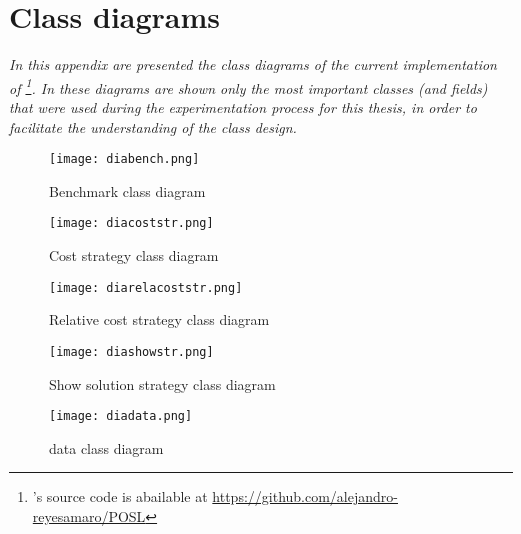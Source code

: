 \chapter{\posl{} Class diagrams}
\label{app:diag}
\textit{In this appendix are presented the class diagrams of the current implementation of \posl\footnote{\posl's source code is abailable at \href{https://github.com/alejandro-reyesamaro/POSL}{https://github.com/alejandro-reyesamaro/POSL}}. In these diagrams are shown only the most important classes (and fields) that were used during the experimentation process for this thesis, in order to facilitate the understanding of the class design.}
\vfill
\newpage



\clearpage


\begin{figure}
	\centering
	\texttt{[image: diabench.png]}
	\caption[]{Benchmark class diagram}\label{diag:bench}
\end{figure}

\begin{figure}
	\centering
	\texttt{[image: diacoststr.png]}
	\caption[]{Cost strategy class diagram}\label{diag:coststr}
\end{figure}

\begin{figure}
	\centering
	\texttt{[image: diarelacoststr.png]}
	\caption[]{Relative cost strategy class diagram}\label{diag:relacoststr}
\end{figure}

\begin{figure}
	\centering
	\texttt{[image: diashowstr.png]}
	\caption[]{Show solution strategy class diagram}\label{diag:showstr}
\end{figure}

\begin{figure}
	\centering
	\texttt{[image: diadata.png]}
	\caption[]{\posl{} data class diagram}\label{diag:data}
\end{figure}

